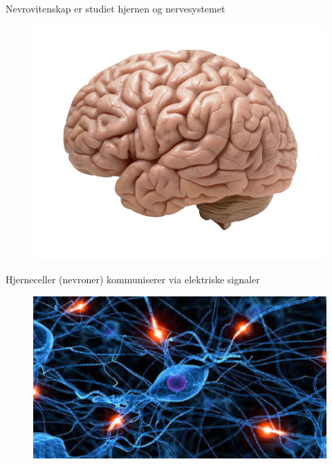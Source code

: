 \documentclass[presentation]{beamer}
\begin{document}
\begin{frame}{Nevrovitenskap er studiet hjernen og nervesystemet}
   \begin{figure}
       {\includegraphics[width=1\textwidth]{brain.jpg}}
\end{figure}
\end{frame}

\begin{frame}{Hjerneceller (nevroner) kommuniserer via elektriske signaler}
   \begin{figure}
       {\includegraphics[width=1\textwidth]{network.jpeg}}
\end{figure}
\end{frame}
\end{document}
